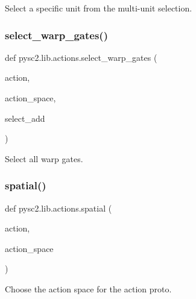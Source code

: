 \begin{DoxyVerb}Select a specific unit from the multi-unit selection.\end{DoxyVerb}
 \mbox{\label{namespacepysc2_1_1lib_1_1actions_afc7eeb20fb416749432c939c229cd861}} 
\subsubsection{\texorpdfstring{select\+\_\+warp\+\_\+gates()}{select\_warp\_gates()}}
{\footnotesize\ttfamily def pysc2.\+lib.\+actions.\+select\+\_\+warp\+\_\+gates (\begin{DoxyParamCaption}\item[{}]{action,  }\item[{}]{action\+\_\+space,  }\item[{}]{select\+\_\+add }\end{DoxyParamCaption})}

\begin{DoxyVerb}Select all warp gates.\end{DoxyVerb}
 \mbox{\label{namespacepysc2_1_1lib_1_1actions_ae0d64d56d198a225acde0531c61b9fe0}} 
\subsubsection{\texorpdfstring{spatial()}{spatial()}}
{\footnotesize\ttfamily def pysc2.\+lib.\+actions.\+spatial (\begin{DoxyParamCaption}\item[{}]{action,  }\item[{}]{action\+\_\+space }\end{DoxyParamCaption})}

\begin{DoxyVerb}Choose the action space for the action proto.\end{DoxyVerb}
 \mbox{\label{namespacepysc2_1_1lib_1_1actions_aa43c5d9a658772be725451a5b9c1e249}} 
